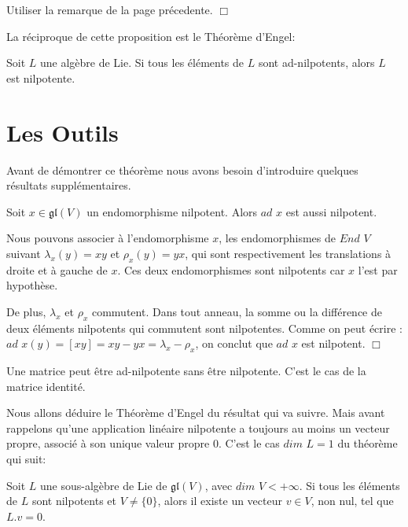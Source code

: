 \documentclass[a4paper,openany,12pt]{report}
\newcommand{\gl}{\mathfrak{gl}}
\theoremstyle{break}
{\theorembodyfont{\upshape}
\newtheorem*{rmq}{Remarque :}
\newtheorem*{prv}{Preuve :}
\newtheorem*{ex}{Exemples :}
\newtheorem*{exe}{Exemple : }
\newtheorem*{nota}{Notation :}
\newtheorem*{dem}{D\'emonstration :}}
\begin{document}
\begin{prv}
\quad Utiliser la remarque de la page précedente. $\Box$
\end{prv}

La réciproque de cette proposition est le Théorème d'Engel:

\begin{thm}\label{thm:engel}
\quad Soit $L$ une algèbre de Lie.
Si tous les éléments de $L$ sont ad-nilpotents, alors $L$ est nilpotente.
\end{thm}

\section{Les Outils}

\quad Avant de démontrer ce théorème nous avons besoin d’introduire quelques résultats supplémentaires.

\begin{lem}\label{lem:E1}
\quad Soit $x \in \gl(V)$ un endomorphisme nilpotent. Alors $ad$ $x$ est aussi nilpotent. 
\end{lem}

\begin{prv}
\quad Nous pouvons associer à l'endomorphisme $x$, les endomorphismes de $End$ $V$ suivant $\lambda_{x}(y)=xy$ et $\rho_{x}(y)=yx$, qui sont respectivement les translations à droite et à gauche de $x$. Ces deux endomorphismes sont nilpotents car $x$ l'est par hypothèse.

De plus, $\lambda_{x}$ et $\rho_{x}$ commutent. Dans tout anneau, la somme ou la différence de deux éléments nilpotents qui commutent sont nilpotentes. Comme on peut écrire :
$ad$ $x(y)= [xy] = xy-yx = \lambda_{x} - \rho_{x}$, on conclut que $ad$ $x$ est nilpotent. $\Box$
\end{prv}

\begin{rmq}
\quad Une matrice peut être ad-nilpotente sans être nilpotente. C'est le cas de la matrice identité. 
\end{rmq}

Nous allons déduire le Théorème d'Engel du résultat qui va suivre. Mais avant rappelons qu'une application linéaire nilpotente a toujours au moins un vecteur propre, associé à son unique valeur propre $0$. C'est le cas $dim$  $L = 1$ du théorème qui suit:

\begin{thm}\label{thm:E1}
\quad Soit $L$ une sous-algèbre de Lie de $\gl (V)$, avec $dim$ $V < + \infty$. Si tous les éléments de $L$ sont nilpotents et $V  \neq  \{0\}$, alors il existe un vecteur $v \in V$, non nul, tel que $L.v = 0$.
\end{thm}
\end{document}
